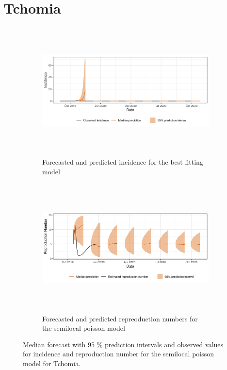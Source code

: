  \section{ Tchomia }\begin{figure}[H]\begin{subfigure}{\textwidth}  \centering  \includegraphics[width=0.9\linewidth, height=7cm]{../output/Tchomia_predictions.png}  \caption{Forecasted and predicted incidence for the best fitting model}\end{subfigure}

\begin{subfigure}{\textwidth}  \centering  \includegraphics[width=0.9\linewidth, height=7cm]{../output/Tchomia_Rs.png}  \caption{Forecasted and predicted repreoduction numbers for the semilocal poisson model}\end{subfigure}  \caption{Median forecast with 95 \% prediction intervals and observed values for incidence and reproduction number for the semilocal poisson model for Tchomia.}\end{figure}

